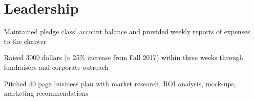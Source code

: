 \documentclass[]{deedy-resume-openfont}
\begin{document}
\begin{minipage}[t]{0.66\textwidth}

\section{Leadership}
\begin{tightemize} 
\item Maintained pledge class’ account balance and provided weekly reports of expenses to the chapter
\item Raised 3000 dollars (a 25\% increase from Fall 2017) within three weeks through fundraisers and corporate outreach
\item Pitched 40 page business plan with market research, ROI analysis, mock-ups, marketing recommendations
\end{tightemize}
\sectionsep



\end{minipage} 
\end{document}
